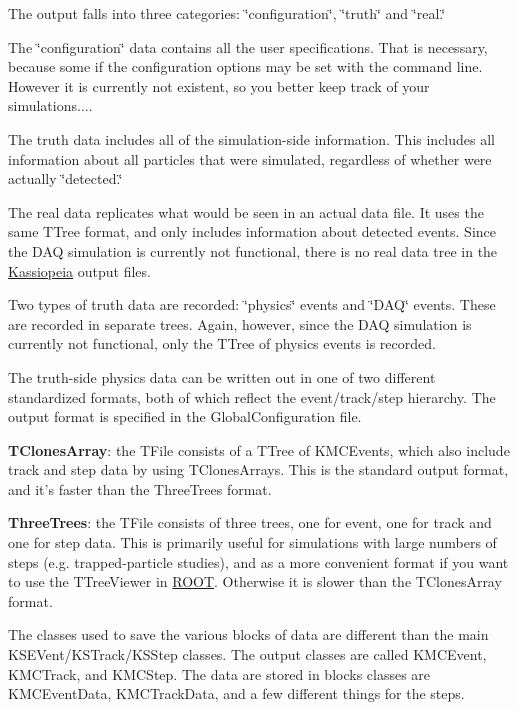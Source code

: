 The output falls into three categories: \char`\"{}configuration\char`\"{}, \char`\"{}truth\char`\"{} and \char`\"{}real.\char`\"{}

The \char`\"{}configuration\char`\"{} data contains all the user specifications. That is necessary, because some if the configuration options may be set with the command line. However it is currently not existent, so you better keep track of your simulations....

The truth data includes all of the simulation-\/side information. This includes all information about all particles that were simulated, regardless of whether were actually \char`\"{}detected.\char`\"{}

The real data replicates what would be seen in an actual data file. It uses the same TTree format, and only includes information about detected events. Since the DAQ simulation is currently not functional, there is no real data tree in the \hyperlink{class_kassiopeia}{Kassiopeia} output files.

Two types of truth data are recorded: \char`\"{}physics\char`\"{} events and \char`\"{}DAQ\char`\"{} events. These are recorded in separate trees. Again, however, since the DAQ simulation is currently not functional, only the TTree of physics events is recorded.

The truth-\/side physics data can be written out in one of two different standardized formats, both of which reflect the event/track/step hierarchy. The output format is specified in the GlobalConfiguration file. 
\begin{DoxyItemize}
\item {\bfseries TClonesArray}: the TFile consists of a TTree of KMCEvents, which also include track and step data by using TClonesArrays. This is the standard output format, and it's faster than the ThreeTrees format. 
\item {\bfseries ThreeTrees}: the TFile consists of three trees, one for event, one for track and one for step data. This is primarily useful for simulations with large numbers of steps (e.g. trapped-\/particle studies), and as a more convenient format if you want to use the TTreeViewer in \hyperlink{namespace_r_o_o_t}{ROOT}. Otherwise it is slower than the TClonesArray format. 
\end{DoxyItemize}

The classes used to save the various blocks of data are different than the main KSEVent/KSTrack/KSStep classes. The output classes are called KMCEvent, KMCTrack, and KMCStep. The data are stored in blocks classes are KMCEventData, KMCTrackData, and a few different things for the steps.

